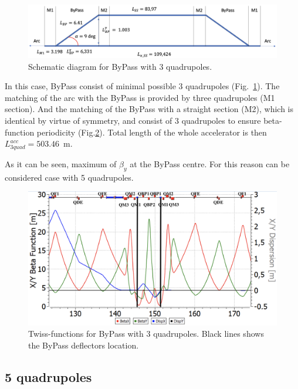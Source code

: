 \documentclass[a4paper,
               keeplastbox,   %
               ]{jacow}
\begin{document}
\begin{figure}[!htb]
   \centering
   \includegraphics*[width=1.\columnwidth]{img/MOPA072_f2-1}
   \caption{Schematic diagram for ByPass with 3 quadrupoles.}
   \label{fig:3quad}
\end{figure}

\par In this case, ByPass consist of minimal possible 3 quadrupoles (Fig.~\ref{fig:3quad}). The matching of the arc with the ByPass is provided by three quadrupoles (M1 section). And the matching of the ByPass with a straight section (M2), which is identical by virtue of symmetry, and consist of 3 quadrupoles to ensure beta-function periodicity (Fig.\ref{fig:3quadTwiss}). Total length of the whole accelerator is then $L^{acc}_{3quad} = 503.46$~m.

\par As it can be seen, maximum of $\beta_y$ at the ByPass centre.
For this reason can be considered case with 5 quadrupoles.

\begin{figure}[!htb]
   \centering
   \includegraphics*[width=1.\columnwidth]{img/MOPA072_f3-1}
   \caption{Twiss-functions for ByPass with 3 quadrupoles. Black lines shows the ByPass deflectors location.}
   \label{fig:3quadTwiss}
\end{figure}

\subsection{5 quadrupoles}
\end{document}
